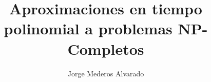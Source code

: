 \documentclass{article}
\begin{document}
\begin{titlepage}
	\title{\textbf{Aproximaciones en tiempo polinomial a problemas NP-Completos}}
	\author{Jorge Mederos Alvarado}
	\date{}
				
	\maketitle
	\thispagestyle{empty}
		
	\tableofcontents
\end{titlepage}

\clearpage


\clearpage


\clearpage


\clearpage


\clearpage
\nocite{*}
\printbibliography
\end{document}
